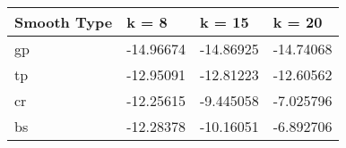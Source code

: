 \begin{table}[!h]
\centering
\begin{tabular}{llll}
\toprule
Smooth Type & k = 8 & k = 15 & k = 20\\
\midrule
gp & -14.96674 & -14.86925 & -14.74068\\
tp & -12.95091 & -12.81223 & -12.60562\\
cr & -12.25615 & -9.445058 & -7.025796\\
bs & -12.28378 & -10.16051 & -6.892706\\
\bottomrule
\end{tabular}
\end{table}
